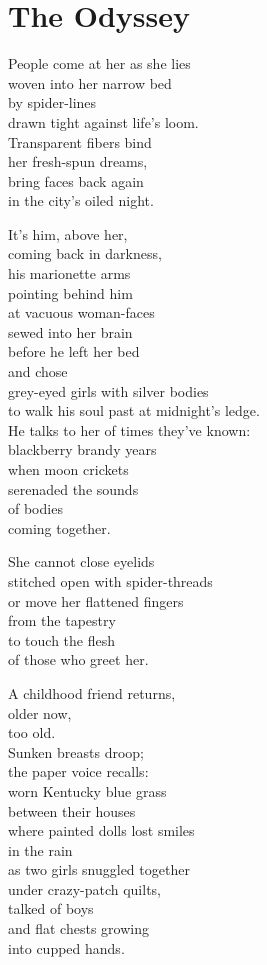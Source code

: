 \documentclass[twoside,10pt]{book}
\begin{document}
\clearpage
\section{The Odyssey}

People come at her as she lies\\
woven into her narrow bed\\
by spider-lines\\
drawn tight against life's loom.\\
Transparent fibers bind\\
her fresh-spun dreams,\\
bring faces back again\\
in the city's oiled night.

It's him, above her,\\
coming back in darkness,\\
his marionette arms\\
pointing behind him\\
at vacuous woman-faces\\
sewed into her brain\\
before he left her bed\\
and chose\\
grey-eyed girls with silver bodies\\
to walk his soul past at midnight's ledge.\\
He talks to her of times they've known:\\
blackberry brandy years\\
when moon crickets\\
serenaded the sounds\\
of bodies\\
coming together.

She cannot close eyelids\\
stitched open with spider-threads\\
or move her flattened fingers\\
from the tapestry\\
to touch the flesh\\
of those who greet her.

A childhood friend returns,\\
older now,\\
too old.\\
Sunken breasts droop;\\
the paper voice recalls:\\
worn Kentucky blue grass\\
between their houses\\
where painted dolls lost smiles\\
in the rain\\
as two girls snuggled together\\
under crazy-patch quilts,\\
talked of boys\\
and flat chests growing\\
into cupped hands.
\end{document}
